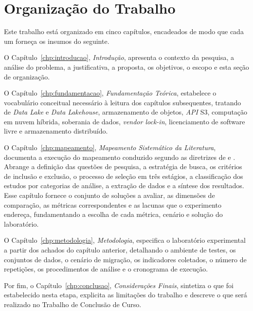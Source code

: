 \section{Organização do Trabalho}
\label{sec:organizacao}

Este trabalho está organizado em cinco capítulos, encadeados de modo que cada um
forneça os insumos do seguinte.

O Capítulo~\ref{chp:introducao}, \textit{Introdução}, apresenta o contexto da
pesquisa, a análise do problema, a justificativa, a proposta, os objetivos, o
escopo e esta seção de organização.

O Capítulo~\ref{chp:fundamentacao}, \textit{Fundamentação Teórica}, estabelece o
vocabulário conceitual necessário à leitura dos capítulos subsequentes, tratando de
\textit{Data Lake} e \textit{Data Lakehouse}, armazenamento de objetos,
\textit{API} S3, computação em nuvem híbrida, soberania de dados, \textit{vendor
lock-in}, licenciamento de software livre e armazenamento distribuído.

O Capítulo~\ref{chp:mapeamento}, \textit{Mapeamento Sistemático da Literatura},
documenta a execução do mapeamento conduzido segundo as diretrizes de
\citep{petersen2015} e \citep{kitchenham2010}. Abrange a definição das
questões de pesquisa, a estratégia de busca, os critérios de inclusão e exclusão, o
processo de seleção em três estágios, a classificação dos estudos por categorias de
análise, a extração de dados e a síntese dos resultados. Esse capítulo fornece o
conjunto de soluções a avaliar, as dimensões de comparação, as métricas
correspondentes e as lacunas que o experimento endereça, fundamentando a escolha de
cada métrica, cenário e solução do laboratório.

O Capítulo~\ref{chp:metodologia}, \textit{Metodologia}, especifica o laboratório
experimental a partir dos achados do capítulo anterior, detalhando o ambiente de
testes, os conjuntos de dados, o cenário de migração, os indicadores coletados, o
número de repetições, os procedimentos de análise e o cronograma de execução.

Por fim, o Capítulo~\ref{chp:conclusao}, \textit{Considerações Finais}, sintetiza o
que foi estabelecido nesta etapa, explicita as limitações do trabalho e descreve o
que será realizado no Trabalho de Conclusão de Curso.
